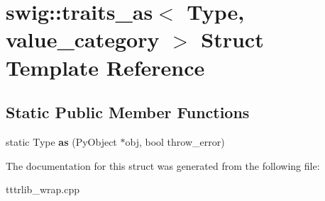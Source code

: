 \hypertarget{structswig_1_1traits__as_3_01_type_00_01value__category_01_4}{}\section{swig\+:\+:traits\+\_\+as$<$ Type, value\+\_\+category $>$ Struct Template Reference}
\label{structswig_1_1traits__as_3_01_type_00_01value__category_01_4}
\subsection*{Static Public Member Functions}
\begin{DoxyCompactItemize}
\item 
\mbox{\label{structswig_1_1traits__as_3_01_type_00_01value__category_01_4_addd7e404759a0808fa9f342f7a0f887b}} 
static Type {\bfseries as} (Py\+Object $\ast$obj, bool throw\+\_\+error)
\end{DoxyCompactItemize}


The documentation for this struct was generated from the following file\+:\begin{DoxyCompactItemize}
\item 
tttrlib\+\_\+wrap.\+cpp\end{DoxyCompactItemize}
